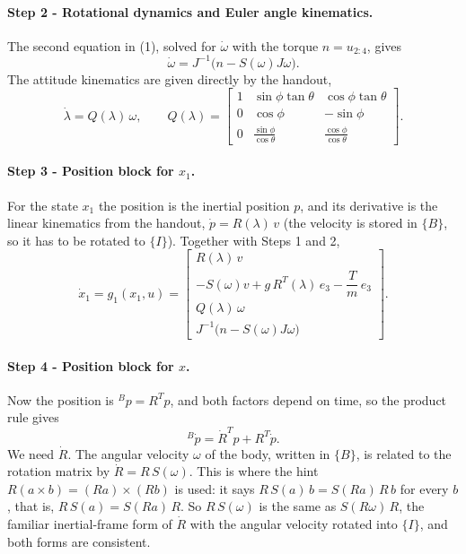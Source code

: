 \paragraph{Step 2 - Rotational dynamics and Euler angle kinematics.}
The second equation in (1), solved for $\dot\omega$ with the torque $n = u_{2:4}$, gives
\begin{equation*}
\dot\omega = J^{-1}\big(n - S(\omega) J \omega\big).
\end{equation*}
The attitude kinematics are given directly by the handout,
\begin{equation*}
\dot\lambda = Q(\lambda)\,\omega, \qquad
Q(\lambda) = \begin{bmatrix} 1 & \sin\phi\tan\theta & \cos\phi\tan\theta \\ 0 & \cos\phi & -\sin\phi \\ 0 & \frac{\sin\phi}{\cos\theta} & \frac{\cos\phi}{\cos\theta} \end{bmatrix}.
\end{equation*}

\paragraph{Step 3 - Position block for $x_1$.}
For the state $x_1$ the position is the inertial position $p$, and its derivative is the linear kinematics from the handout, $\dot p = R(\lambda)\, v$ (the velocity is stored in $\{B\}$, so it has to be rotated to $\{I\}$).
Together with Steps 1 and 2,
\begin{equation*}
\dot x_1 = g_1(x_1, u) =
\begin{bmatrix}
R(\lambda)\, v \\[4pt]
-S(\omega) v + g\, R^T(\lambda)\, e_3 - \dfrac{T}{m}\, e_3 \\[8pt]
Q(\lambda)\, \omega \\[4pt]
J^{-1}\big(n - S(\omega) J \omega\big)
\end{bmatrix}.
\end{equation*}

\paragraph{Step 4 - Position block for $x$.}
Now the position is ${}^B p = R^T p$, and both factors depend on time, so the product rule gives
\begin{equation*}
{}^B\dot p = \dot R^T p + R^T \dot p .
\end{equation*}
We need $\dot R$.
The angular velocity $\omega$ of the body, written in $\{B\}$, is related to the rotation matrix by $\dot R = R\, S(\omega)$.
This is where the hint $R(a \times b) = (Ra) \times (Rb)$ is used: it says $R\,S(a)\,b = S(Ra)\,R\,b$ for every $b$, that is, $R\,S(a) = S(Ra)\,R$.
So $R\,S(\omega)$ is the same as $S(R\omega)\,R$, the familiar inertial-frame form of $\dot R$ with the angular velocity rotated into $\{I\}$, and both forms are consistent.

